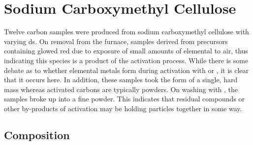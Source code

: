 \newpage
\section{Sodium Carboxymethyl Cellulose}
\label{ss:NC}

Twelve carbon samples were produced from sodium carboxymethyl cellulose with varying \acrshort{ds}. On removal from the furnace, samples derived from precursors containing  glowed red due to exposure of small amounts of elemental  to air, thus indicating this species is a product of the activation process. While there is some debate as to whether elemental metals form during activation with  or ,\citep{Blankenship2022Modulating, Sevilla2014Energy, LozanoCastello2007Carbon, Kelemen1983interaction, Xue2003Formation} it is clear that it occurs here. In addition, these samples took the form of a single, hard mass whereas activated carbons are typically powders. On washing with , the samples broke up into a fine powder. This indicates that residual  compounds or other by-products of activation may be holding particles together in some way.

\subsection{Composition}
\label{sss:NC_composition}

